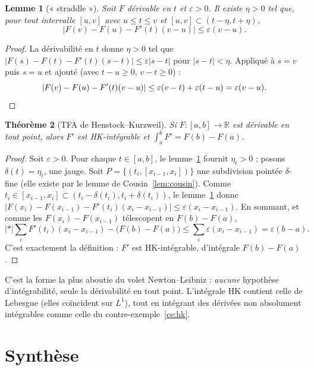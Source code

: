 \documentclass[11pt]{article}
\theoremstyle{thmblue}
\newtheorem{theoreme}{Théorème}[section]
\newtheorem{lemme}[theoreme]{Lemme}
\theoremstyle{defplain}
\theoremstyle{rem}
\newcommand{\R}{\mathbb{R}}
\newcommand{\abs}[1]{\left\lvert #1 \right\rvert}
\newcommand{\eps}{\varepsilon}
\begin{document}
\begin{lemme}[« straddle »]\label{lem:straddle}
Soit $F$ dérivable en $t$ et $\eps>0$. Il existe $\eta>0$ tel que, pour tout intervalle $[u,v]$ avec
$u\le t\le v$ et $[u,v]\subset(t-\eta,t+\eta)$,
\[
\abs{F(v)-F(u)-F'(t)(v-u)}\le\eps(v-u).
\]
\end{lemme}

\begin{proof}
La dérivabilité en $t$ donne $\eta>0$ tel que $\abs{F(s)-F(t)-F'(t)(s-t)}\le\eps\abs{s-t}$ pour
$\abs{s-t}<\eta$. Appliqué à $s=v$ puis $s=u$ et ajouté (avec $t-u\ge0$, $v-t\ge0$) :
\[
\abs{F(v)-F(u)-F'(t)(v-u)}\le\eps(v-t)+\eps(t-u)=\eps(v-u).\qedhere
\]
\end{proof}

\begin{theoreme}[TFA de Henstock--Kurzweil]\label{thm:hk}
Si $F:[a,b]\to\R$ est dérivable en \emph{tout} point, alors $F'$ est HK-intégrable et
$\int_a^b F'=F(b)-F(a)$.
\end{theoreme}

\begin{proof}
Soit $\eps>0$. Pour chaque $t\in[a,b]$, le lemme~\ref{lem:straddle} fournit $\eta_t>0$ ; posons
$\delta(t)=\eta_t$, une jauge. Soit $P=\{(t_i,[x_{i-1},x_i])\}$ une subdivision pointée $\delta$-fine
(elle existe par le lemme de Cousin~\ref{lem:cousin}). Comme $t_i\in[x_{i-1},x_i]\subset
(t_i-\delta(t_i),t_i+\delta(t_i))$, le lemme~\ref{lem:straddle} donne
$\abs{F(x_i)-F(x_{i-1})-F'(t_i)(x_i-x_{i-1})}\le\eps(x_i-x_{i-1})$. En sommant, et comme les
$F(x_i)-F(x_{i-1})$ télescopent en $F(b)-F(a)$,
\[
\abs*{\sum_i F'(t_i)(x_i-x_{i-1})-\bigl(F(b)-F(a)\bigr)}
\le\sum_i\eps(x_i-x_{i-1})=\eps(b-a).
\]
C'est exactement la définition : $F'$ est HK-intégrable, d'intégrale $F(b)-F(a)$.
\end{proof}

C'est la forme la plus aboutie du volet Newton--Leibniz : \emph{aucune} hypothèse d'intégrabilité,
seule la dérivabilité en tout point. L'intégrale HK contient celle de Lebesgue (elles coïncident sur
$L^1$), tout en intégrant des dérivées non absolument intégrables comme celle du
contre-exemple~\ref{ce:hk}.

\section{Synthèse}
\end{document}

